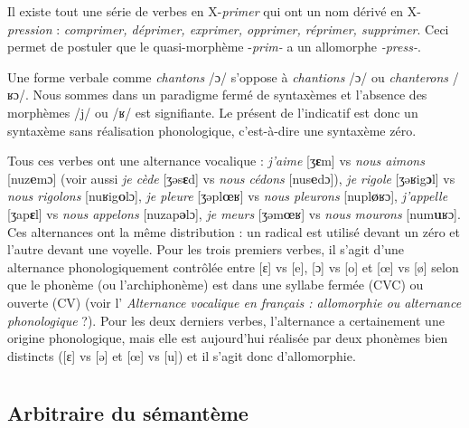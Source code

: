 {     Il existe tout une série de verbes en X-\textit{primer} qui ont un nom dérivé en X-\textit{pression} : \textit{comprimer, déprimer, exprimer, opprimer, réprimer, supprimer}. Ceci permet de postuler que le quasi-morphème -\textit{prim-} a un allomorphe \textit{{}-press-}.

     Une forme verbale comme \textit{chantons} /ɔ/ s’oppose à \textit{chantions} /ɔ/ ou \textit{chanterons} /ʁɔ/. Nous sommes dans un paradigme fermé de syntaxèmes et l’absence des morphèmes /j/ ou /ʁ/ est signifiante. Le présent de l’indicatif est donc un syntaxème sans réalisation phonologique, c’est-à-dire une syntaxème zéro.

     Tous ces verbes ont une alternance vocalique : \textit{j’aime} [ʒ\textbf{ɛ}m] vs \textit{nous aimons} [nuz\textbf{e}mɔ] (voir aussi \textit{je cède} [ʒǝs\textbf{ɛ}d] vs \textit{nous cédons} [nus\textbf{e}dɔ]), \textit{je rigole} [ʒǝʁig\textbf{ɔ}l] vs \textit{nous rigolons} [nuʁig\textbf{o}lɔ], \textit{je pleure} [ʒǝpl\textbf{œ}ʁ] vs \textit{nous pleurons} [nupl\textbf{ø}ʁɔ], \textit{j’appelle} [ʒap\textbf{ɛ}l] vs \textit{nous appelons} [nuzap\textbf{ǝ}lɔ], \textit{je meurs} [ʒǝm\textbf{œ}ʁ] vs \textit{nous mourons} [num\textbf{u}ʁɔ]. Ces alternances ont la même distribution : un radical est utilisé devant un zéro et l’autre devant une voyelle. Pour les trois premiers verbes, il s’agit d’une alternance phonologiquement contrôlée entre [ɛ] vs [e], [ɔ] vs [o] et [œ] vs [ø] selon que le phonème (ou l’archiphonème) est dans une syllabe fermée (CVC) ou ouverte (CV) (voir l’ \textit{Alternance vocalique en français : allomorphie ou alternance phonologique} ?). Pour les deux derniers verbes, l’alternance a certainement une origine phonologique, mais elle est aujourd’hui réalisée par deux phonèmes bien distincts ([ɛ] vs [ǝ] et [œ] vs [u]) et il s’agit donc d’allomorphie.
}
\chapter{}\label{sec:2.3}

\section{Arbitraire du sémantème}\label{sec:2.3.0}

